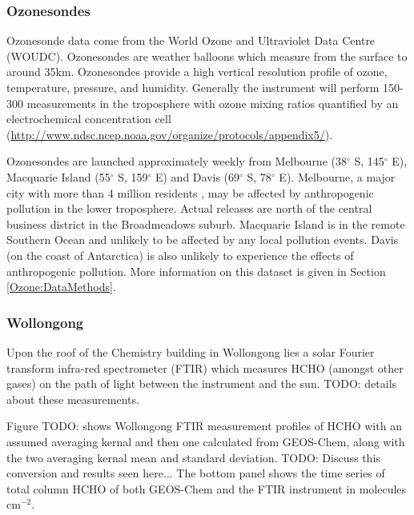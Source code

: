    
    
    \subsubsection{Ozonesondes}
    \label{Model:datasets:ozonesondes}
    
      Ozonesonde data come from the World Ozone and Ultraviolet Data Centre (WOUDC).
      Ozonesondes are weather balloons which measure from the surface to around 35km.
      Ozonesondes provide a high vertical resolution profile of ozone, temperature, pressure, and humidity.
      Generally the instrument will perform 150-300 measurements in the troposphere with ozone mixing ratios quantified by an electrochemical concentration cell (\url{http://www.ndsc.ncep.noaa.gov/organize/protocols/appendix5/}).
      
      Ozonesondes are launched approximately weekly from Melbourne (38$^{\circ}$ S, 145$^{\circ}$ E), Macquarie Island (55$^{\circ}$ S, 159$^{\circ}$ E) and Davis (69$^{\circ}$ S, 78$^{\circ}$ E). 
      Melbourne, a major city with more than 4 million residents \parencite{ABS2016}, may be affected by anthropogenic pollution in the lower troposphere.
      Actual releases are north of the central business district in the Broadmeadows suburb.
      Macquarie Island is in the remote Southern Ocean and unlikely to be affected by any local pollution events.
      Davis (on the coast of Antarctica) is also unlikely to experience the effects of anthropogenic pollution.
      More information on this dataset is given in Section \ref{Ozone:DataMethods}.
    
    \subsubsection{Wollongong}
    \label{Model:datasets:wollongong_ftir}
    
      Upon the roof of the Chemistry building in Wollongong lies a solar Fourier transform infra-red spectrometer (FTIR) which measures HCHO (amongst other gases) on the path of light between the instrument and the sun.
      TODO: details about these measurements.
      
      Figure TODO: shows Wollongong FTIR measurement profiles of HCHO with an assumed averaging kernal and then one calculated from GEOS-Chem, along with the two averaging kernal mean and standard deviation.
      TODO: Discuss this conversion and results seen here...
      The bottom panel shows the time series of total column HCHO of both GEOS-Chem and the FTIR instrument in molecules cm$^{-2}$.
    
